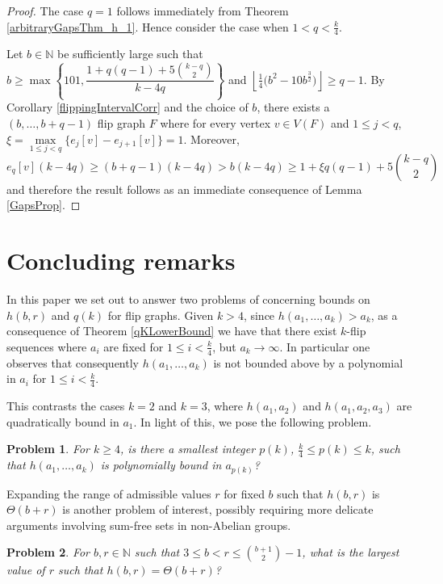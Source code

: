 \documentclass[a4paper,12pt]{article}
\newtheorem{problem}{Problem}
\begin{document}
\begin{proof}
	The case $q = 1$ follows immediately from Theorem \ref{arbitraryGapsThm_h_1}. Hence consider the case when $1 < q < \frac{k}{4}$. 
	
	Let $b \in \mathbb{N}$ be sufficiently large such that $b \geq \max\left\{101, \dfrac{1 + q(q-1)+5\binom{k-q}{2}}{k-4q}\right\}$ and $\left\lfloor \frac{1}{4} \big(b^2 - 10b^{\frac{3}{2}}\big)\right\rfloor \geq q - 1$. By Corollary \ref{flippingIntervalCorr} and the choice of $b$, there exists a $(b, \dots, b + q - 1)$ flip graph $F$ where for every vertex $v \in V(F)$ and $1 \leq j < q$, $\xi = \max\limits_{1 \leq j < q}\{e_j [v] - e_{j+1} [v]\} = 1$. Moreover, $$e_q [v] (k - 4q) \geq (b + q - 1)(k - 4q) > b(k - 4q) \geq 1 + \xi q(q-1)+5\binom{k-q}{2}$$ and therefore the result follows as an immediate consequence of Lemma \ref{GapsProp}.
\end{proof}
\section{Concluding remarks}

In this paper we set out to answer two problems of \cite{caro2023flip} concerning bounds on $h(b,r)$ and $q(k)$ for flip graphs. Given $k > 4$, since $h(a_1, \dots, a_k) > a_k$, as a consequence of Theorem \ref{qKLowerBound} we have that there exist $k$-flip sequences where $a_i$ are fixed for $1 \leq i < \frac{k}{4}$, but $a_k \to \infty$. In particular one observes that consequently $h(a_1, \dots, a_k)$ is not bounded above by a polynomial in $a_i$ for $1 \leq i < \frac{k}{4}$.

This contrasts the cases $k = 2$ and $k = 3$, where $h(a_1, a_2)$ and $h(a_1, a_2, a_3)$ are quadratically bound in $a_1$. In light of this, we pose the following problem.

\begin{problem}
	For $k \geq 4$, is there a smallest integer $p(k)$, $\frac{k}{4} \leq p(k) \leq k$, such that $h(a_1, \dots, a_k)$ is polynomially bound in $a_{p(k)}$?
\end{problem}

Expanding the range of admissible values $r$ for fixed $b$ such that $h(b, r)$ is $\Theta(b + r)$ is another problem of interest, possibly requiring more delicate arguments involving sum-free sets in non-Abelian groups. 

\begin{problem}
For $b, r \in \mathbb{N}$ such that $3 \leq b < r \leq \binom{b + 1}{2} - 1$, what is the largest value of $r$ such that $h(b, r) = \Theta(b + r)$?
\end{problem}
\end{document}
